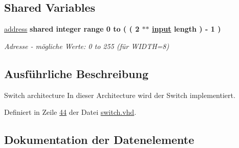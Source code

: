 \subsection*{Shared Variables}
 \begin{DoxyCompactItemize}
\item 
\mbox{\label{classswitch_1_1switch_a5229ed80855aa1ab6c3125663592e274}} 
\mbox{\hyperlink{classswitch_1_1switch_a5229ed80855aa1ab6c3125663592e274}{address}} {\bfseries \textcolor{keywordflow}{shared}\textcolor{vhdlchar}{ }\textcolor{comment}{integer}\textcolor{vhdlchar}{ }\textcolor{vhdlchar}{ }\textcolor{vhdlchar}{ }\textcolor{keywordflow}{range}\textcolor{vhdlchar}{ }\textcolor{vhdlchar}{ } \textcolor{vhdldigit}{0} \textcolor{vhdlchar}{ }\textcolor{keywordflow}{to}\textcolor{vhdlchar}{ }\textcolor{vhdlchar}{(}\textcolor{vhdlchar}{ }\textcolor{vhdlchar}{(}\textcolor{vhdlchar}{ }\textcolor{vhdlchar}{ } \textcolor{vhdldigit}{2} \textcolor{vhdlchar}{$\ast$}\textcolor{vhdlchar}{$\ast$}\textcolor{vhdlchar}{ }\textcolor{vhdlchar}{ }\textcolor{vhdlchar}{ }{\bfseries \mbox{\hyperlink{classswitch_a2b3987f98197ec2f7358c2e5e91f234e}{input}}} \textcolor{vhdlchar}{ }\textcolor{vhdlchar}{\textquotesingle{}}\textcolor{vhdlchar}{ }\textcolor{vhdlkeyword}{length}\textcolor{vhdlchar}{ }\textcolor{vhdlchar}{)}\textcolor{vhdlchar}{ }\textcolor{vhdlchar}{-\/}\textcolor{vhdlchar}{ } \textcolor{vhdldigit}{1} \textcolor{vhdlchar}{ }\textcolor{vhdlchar}{)}\textcolor{vhdlchar}{ }} 
\begin{DoxyCompactList}\small\item\em Adresse -\/ mögliche Werte\+: 0 to 255 (für W\+I\+D\+TH=8) \end{DoxyCompactList}\end{DoxyCompactItemize}


\subsection{Ausführliche Beschreibung}
Switch architecture In dieser Architecture wird der Switch implementiert. 

Definiert in Zeile \mbox{\hyperlink{switch_8vhd_source_l00044}{44}} der Datei \mbox{\hyperlink{switch_8vhd_source}{switch.\+vhd}}.



\subsection{Dokumentation der Datenelemente}
\mbox{\label{classswitch_1_1switch_a138ff3d13d23e477480ce8fb57e9eab2}} 
